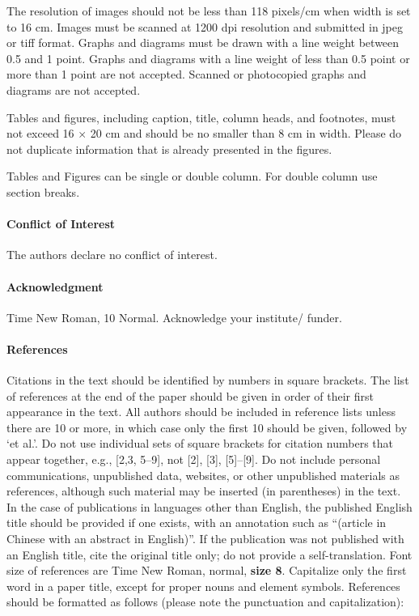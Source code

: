 \documentclass{article} %
\begin{document}
\begin{multicols}{2}
The resolution of images should not be less than 118 pixels/cm when width is set to 16 cm. Images must be scanned at 1200 dpi resolution and submitted in jpeg or tiff format. Graphs and diagrams must be drawn with a line weight between 0.5 and 1 point. Graphs and diagrams with a line weight of less than 0.5 point or more than 1 point are not accepted. Scanned or photocopied graphs and diagrams are not accepted. \par

Tables and figures, including caption, title, column heads, and footnotes, must not exceed 16 $\times$ 20 cm and should be no smaller than 8 cm in width. Please do not duplicate information that is already presented in the figures. \par

\noindent Tables and Figures can be single or double column. For double column use section breaks.



\paragraph{Conflict of Interest}

The authors declare no conflict of interest.


\paragraph{Acknowledgment}

Time New Roman, 10 Normal. Acknowledge your institute/ funder. 


\paragraph{References}

Citations in the text should be identified by numbers in square brackets. The list of references at the end of the paper should be given in order of their first appearance in the text. All authors should be included in reference lists unless there are 10 or more, in which case only the first 10 should be given, followed by `et al.'. Do not use individual sets of square brackets for citation numbers that appear together, e.g., [2,3, 5--9], not [2], [3], [5]--[9]. Do not include personal communications, unpublished data, websites, or other unpublished materials as references, although such material may be inserted (in parentheses) in the text. In the case of publications in languages other than English, the published English title should be provided if one exists, with an annotation such as ``(article in Chinese with an abstract in English)''. If the publication was not published with an English title, cite the original title only; do not provide a self-translation. Font size of references are Time New Roman, normal, \textbf{size 8}. Capitalize only the first word in a paper title, except for proper nouns and element symbols. References should be formatted as follows (please note the punctuation and capitalization): \\


\end{multicols}
\end{document}
